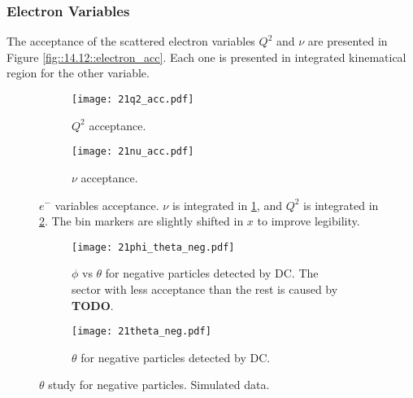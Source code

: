 \subsubsection{Electron Variables}
\label{14.21::electron_variables}
    The acceptance of the scattered electron variables $Q^2$ and $\nu$ are presented in Figure \ref{fig::14.12::electron_acc}.
    Each one is presented in integrated kinematical region for the other variable.

    \begin{figure}[t!]
        \centering
        \begin{subfigure}[b]{\textwidth}
            \centering
            \texttt{[image: 21q2\_acc.pdf]}
            \caption{$Q^2$ acceptance.}
            \label{fig::14.21::q2_acc}
        \end{subfigure}
        \hfill
        \begin{subfigure}[b]{\textwidth}
            \centering
            \texttt{[image: 21nu\_acc.pdf]}
            \caption{$\nu$ acceptance.}
            \label{fig::14.21::nu_acc}
        \end{subfigure}
        \caption[$e^-$ variables acceptance]
        {$e^-$ variables acceptance.
        $\nu$ is integrated in \ref{fig::14.21::q2_acc}, and $Q^2$ is integrated in \ref{fig::14.21::nu_acc}.
        The bin markers are slightly shifted in $x$ to improve legibility.}
        \label{fig::14.21::electron_acc}
    \end{figure}

    \begin{figure}
        \centering
        \begin{subfigure}[b]{\textwidth}
            \centering
            \texttt{[image: 21phi\_theta\_neg.pdf]}
            \caption[$\phi$ vs $\theta$ for negative particles]
            {$\phi$ vs $\theta$ for negative particles detected by DC.
            The sector with less acceptance than the rest is caused by \textbf{TODO}.}
            \label{fig::14.21::phi_theta_neg}
        \end{subfigure}
        \begin{subfigure}[b]{\textwidth}
            \centering
            \texttt{[image: 21theta\_neg.pdf]}
            \caption[$\theta$ for negative particles]
            {$\theta$ for negative particles detected by DC.}
            \label{fig::14.21::theta_neg}
        \end{subfigure}
        \caption[$\theta$ study for negative particles]
        {$\theta$ study for negative particles.
        Simulated data.}
        \label{fig::14.21::theta_study_neg}
    \end{figure}

